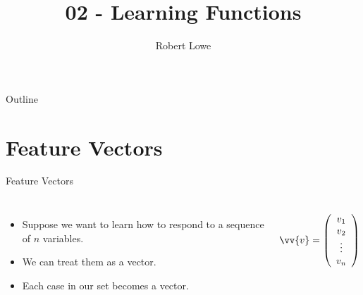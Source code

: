 \documentclass[handout]{beamer}
\title{02 - Learning Functions}
\author{Robert Lowe}
\institute[Southeast Missouri State University] %
{
  Department of Computer Science\\
  Southeast Missouri State University
}
\date[]{}
\begin{document}
\begin{frame}
  \titlepage
\end{frame}

\begin{frame}{Outline}
  \tableofcontents
\end{frame}





\section{Feature Vectors}
\begin{frame}{Feature Vectors}
    \begin{columns}
        \begin{itemize}
            \item Suppose we want to learn how to respond to a sequence of $n$ variables.
            \item We can treat them as a vector.
            \item Each case in our set becomes a vector.
        \end{itemize}
    
        \[
        \vv{v} = \left(
        \begin{array}{c}
            v_1 \\
            v_2 \\
            \vdots\\
            v_n
        \end{array}
        \right)
        \]
    \end{columns}
\end{frame}
\end{document}
